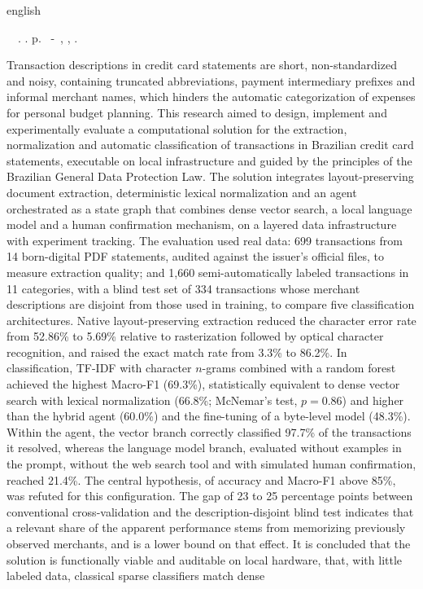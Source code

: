 \begin{resumo}[Abstract]
 \begin{otherlanguage*}{english}
	\begin{flushleft}
		\setlength{\absparsep}{0pt} %
 		\SingleSpacing  		\imprimirautorabr~~\textbf{\imprimirtitleabstract}.	\imprimirdata.  \pageref{LastPage} p.
		\imprimirtipotrabalhoabs~-~\imprimirinstituicao, \imprimirlocal, 	\imprimirdata.
 	\end{flushleft}
	\OnehalfSpacing
   Transaction descriptions in credit card statements are short, non-standardized and noisy, containing truncated abbreviations, payment intermediary prefixes and informal merchant names, which hinders the automatic categorization of expenses for personal budget planning. This research aimed to design, implement and experimentally evaluate a computational solution for the extraction, normalization and automatic classification of transactions in Brazilian credit card statements, executable on local infrastructure and guided by the principles of the Brazilian General Data Protection Law. The solution integrates layout-preserving document extraction, deterministic lexical normalization and an agent orchestrated as a state graph that combines dense vector search, a local language model and a human confirmation mechanism, on a layered data infrastructure with experiment tracking. The evaluation used real data: 699 transactions from 14 born-digital PDF statements, audited against the issuer's official files, to measure extraction quality; and 1,660 semi-automatically labeled transactions in 11 categories, with a blind test set of 334 transactions whose merchant descriptions are disjoint from those used in training, to compare five classification architectures. Native layout-preserving extraction reduced the character error rate from 52.86\% to 5.69\% relative to rasterization followed by optical character recognition, and raised the exact match rate from 3.3\% to 86.2\%. In classification, TF-IDF with character $n$-grams combined with a random forest achieved the highest Macro-F1 (69.3\%), statistically equivalent to dense vector search with lexical normalization (66.8\%; McNemar's test, $p = 0.86$) and higher than the hybrid agent (60.0\%) and the fine-tuning of a byte-level model (48.3\%). Within the agent, the vector branch correctly classified 97.7\% of the transactions it resolved, whereas the language model branch, evaluated without examples in the prompt, without the web search tool and with simulated human confirmation, reached 21.4\%. The central hypothesis, of accuracy and Macro-F1 above 85\%, was refuted for this configuration. The gap of 23 to 25 percentage points between conventional cross-validation and the description-disjoint blind test indicates that a relevant share of the apparent performance stems from memorizing previously observed merchants, and is a lower bound on that effect. It is concluded that the solution is functionally viable and auditable on local hardware, that, with little labeled data, classical sparse classifiers match dense 
\end{otherlanguage*}
\end{resumo}
